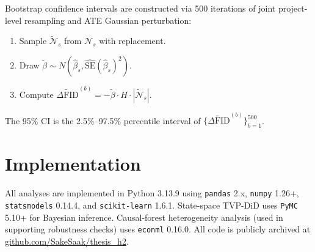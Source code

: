 Bootstrap confidence intervals are constructed via 500 iterations of joint project-level resampling and ATE Gaussian perturbation:
\begin{enumerate}
\item Sample $\tilde{\mathcal{N}}_s$ from $\mathcal{N}_s$ with replacement.
\item Draw $\tilde{\beta} \sim N(\hat{\beta}_s, \widehat{\text{SE}}(\hat{\beta}_s)^2)$.
\item Compute $\widetilde{\Delta\text{FID}}^{(b)} = -\tilde{\beta} \cdot H \cdot |\tilde{\mathcal{N}}_s|$.
\end{enumerate}
The 95\% CI is the 2.5\%--97.5\% percentile interval of $\{\widetilde{\Delta\text{FID}}^{(b)}\}_{b=1}^{500}$.

\section{Implementation}

All analyses are implemented in Python 3.13.9 using \texttt{pandas} 2.x, \texttt{numpy} 1.26+, \texttt{statsmodels} 0.14.4, and \texttt{scikit-learn} 1.6.1. State-space TVP-DiD uses \texttt{PyMC} 5.10+ for Bayesian inference. Causal-forest heterogeneity analysis (used in supporting robustness checks) uses \texttt{econml} 0.16.0. All code is publicly archived at \href{https://github.com/SakeSaak/thesis_h2}{github.com/SakeSaak/thesis\_h2}.
